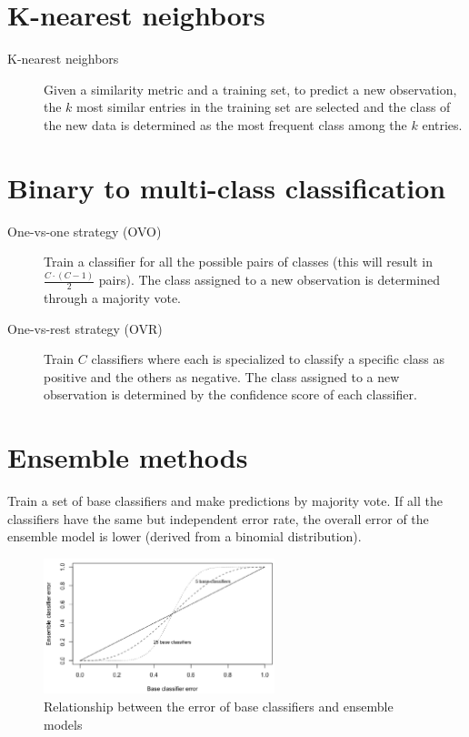 \section{K-nearest neighbors}

\begin{description}
    \item[K-nearest neighbors] 
        Given a similarity metric and a training set,
        to predict a new observation, the $k$ most similar entries in the training set are selected
        and the class of the new data is determined as the most frequent class among the $k$ entries.
\end{description}



\section{Binary to multi-class classification}

\begin{description}
    \item[One-vs-one strategy (OVO)] 
        Train a classifier for all the possible pairs of classes (this will result in $\frac{C \cdot (C-1)}{2}$ pairs).
        The class assigned to a new observation is determined through a majority vote.

    \item[One-vs-rest strategy (OVR)] 
        Train $C$ classifiers where each is specialized to classify a specific class as positive and the others as negative.
        The class assigned to a new observation is determined by the confidence score of each classifier.
\end{description}



\section{Ensemble methods}
Train a set of base classifiers and make predictions by majority vote.
If all the classifiers have the same but independent error rate, 
the overall error of the ensemble model is lower (derived from a binomial distribution).

\begin{figure}[h]
    \centering
    \includegraphics[width=0.6\textwidth]{img/ensemble_error.png}
    \caption{Relationship between the error of base classifiers and ensemble models}
\end{figure}


